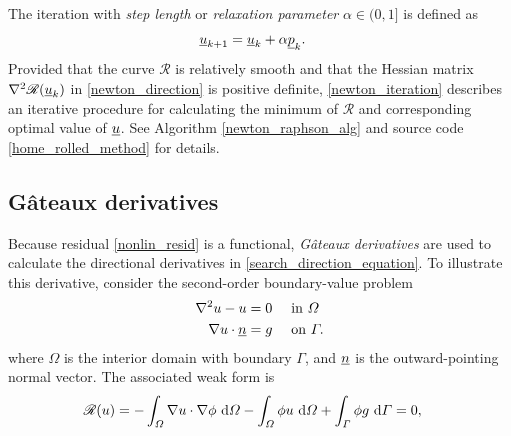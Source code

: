 The iteration with \emph{step length} or \emph{relaxation parameter} $\alpha \in (0,1]$ is defined as
\begin{align}
  \label{newton_iteration}
  \underline{u}_{k+1} &= \underline{u}_k + \alpha \underline{p}_k.
\end{align}
Provided that the curve $\mathscr{R}$ is relatively smooth and that the Hessian matrix $\nabla^2 \mathscr{R}(\underline{u}_k)$ in \cref{newton_direction} is positive definite, \cref{newton_iteration} describes an iterative procedure for calculating the minimum of $\mathscr{R}$ and corresponding optimal value of $\underline{u}$.  See Algorithm \cref{newton_raphson_alg} and \CSLVR source code \cref{home_rolled_method} for details.

\subsection{G\^{a}teaux derivatives} \label{ssn_gateaux}

Because residual \cref{nonlin_resid} is a functional,   \emph{G\^{a}teaux derivatives} are used to calculate the directional derivatives in \cref{search_direction_equation}.  To illustrate this derivative, consider the second-order boundary-value problem
\begin{align*}
  \nabla^2 u - u &= 0 &&\text{ in } \varOmega \\
  \nabla u \cdot \underline{n} &= g &&\text{ on } \varGamma.
\end{align*}
where $\Omega$ is the interior domain with boundary $\Gamma$, and $\underline{n}$ is the outward-pointing normal vector.  The associated weak form is
\begin{align}
  \label{gateaux_example_form}
  \mathscr{R}(u) &= - \int_{\varOmega} \nabla u \cdot \nabla \phi \ \mathrm{d}\varOmega - \int_{\varOmega} \phi u \ \mathrm{d}\varOmega + \int_{\varGamma} \phi g \ \mathrm{d}\varGamma = 0,
\end{align}

